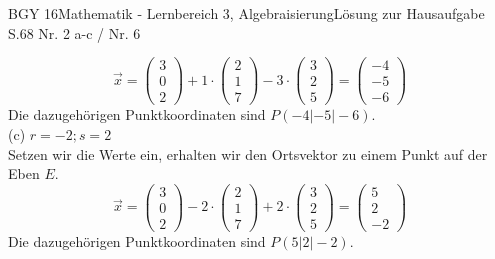 \documentclass[oneside,openany,headings=optiontotoc,11pt,numbers=noenddot]{scrreprt}
\begin{document}
\begin{worksheet}{BGY 16}{Mathematik - Lernbereich 3, Algebraisierung}{Lösung zur Hausaufgabe S.68 Nr. 2 a-c / Nr. 6}
\begin{framed}
			\[\vec{x} = \left(\begin{matrix}3\\0\\2\end{matrix}\right) + 1\cdot\left(\begin{matrix}2\\1\\7\end{matrix}\right) -3\cdot\left(\begin{matrix}3\\2\\5\end{matrix}\right) = \left(\begin{matrix}-4\\-5\\-6\end{matrix}\right)\]
			Die dazugehörigen Punktkoordinaten sind \colorbox{green!10}{\underline{\(P(-4|-5|-6)\)}}.\\
			(c) \(r = -2; s=2\)\\
			Setzen wir die Werte ein, erhalten wir den Ortsvektor zu einem Punkt auf der Eben \(E\).\\
			\[\vec{x} = \left(\begin{matrix}3\\0\\2\end{matrix}\right) - 2\cdot\left(\begin{matrix}2\\1\\7\end{matrix}\right) + 2\cdot\left(\begin{matrix}3\\2\\5\end{matrix}\right) = \left(\begin{matrix}5\\2\\-2\end{matrix}\right)\]
			Die dazugehörigen Punktkoordinaten sind \colorbox{green!10}{\underline{\(P(5|2|-2)\)}}.
		\end{framed}
	

\end{worksheet}
\end{document}
